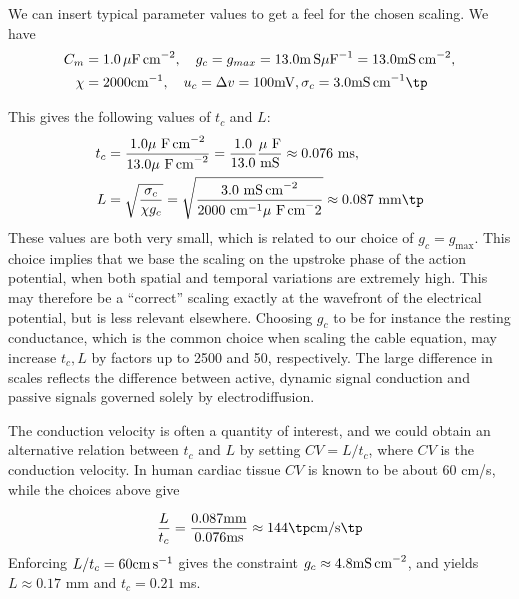 \documentclass[graybox,envcountchap,sectrefs,final]{svmonodo}
\begin{document}
We can insert typical parameter values to get a feel for the
chosen scaling. We have
\begin{align*}
C_m &= 1.0\, \mu\hbox{F\,cm}^{-2}, \quad g_c = g_{max} = 13.0
\hbox{m\,S}\mu\hbox{F}^{-1} = 13.0 \hbox{mS\,cm}^{-2}, \\ 
\chi &= 2000 \hbox{cm}^{-1} , \quad u_c = \Delta v = 100 \hbox{mV} , 
\sigma_c = 3.0 \hbox{mS\,cm}^{-1}\tp
\end{align*}

This gives the following values of $t_c$ and $L$:
\begin{align*}
t_c &= \frac{1.0 \mu\hbox{ F\,cm}^{-2}}{13.0 \mu\hbox{ F\,cm}^{-2}} =
\frac{1.0}{13.0}\frac{\mu\hbox{ F}}{\hbox{mS}} \approx 0.076 \hbox{ ms}, \\ 
L &= \sqrt{\frac{\sigma_c}{\chi g_c}} = \sqrt{\frac{3.0
\hbox{ mS\,cm}^{-2}}{2000\hbox{ cm}^{-1} \mu\hbox{ F\,cm}^-2}}
\approx 0.087 \hbox{ mm} \tp
\end{align*}
These values are both very small, which is related to our
choice of $g_c = g_{\max}$. This choice implies that we base the
scaling on the upstroke phase of the action potential, when both
spatial and temporal variations are extremely high. This may therefore
be a ``correct'' scaling exactly at the wavefront of the electrical
potential, but is less relevant elsewhere. Choosing $g_c$ to be for
instance the resting conductance, which is the common choice when
scaling the cable equation, may increase $t_c, L$ by factors up to 2500 and
50, respectively. The large difference in scales reflects the
difference between active, dynamic signal conduction and passive
signals governed solely by electrodiffusion. 

The conduction velocity is often a quantity of interest, and we could
obtain an alternative relation between $t_c$ and $L$ by setting
$CV = L/t_c$, where $CV$ is the conduction velocity. 
In human cardiac tissue $CV$ is known to be about
60 cm/s, while the choices above give

\[
\frac{L}{t_c} =  \frac{0.087\rm{mm}}{0.076\rm{ms}} \approx 144 \tp
\hbox{cm/s}\tp \]
Enforcing $L/t_c = 60 \hbox{cm\,s}^{-1}$ gives the constraint $g_c \approx
4.8 \hbox{mS\,cm}^{-2}$, and yields $L \approx 0.17$ mm and
$t_c=0.21$ ms. 
\end{document}
